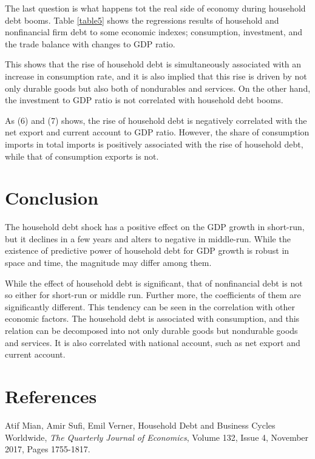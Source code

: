 \documentclass{ltjarticle}
\begin{document}
The last question is what happens tot the real side of economy during household debt booms. Table \ref{table5} shows the regressions results of household and nonfinancial firm debt to some economic indexes; consumption, investment, and the trade balance with changes to GDP ratio. 

This shows that the rise of household debt is simultaneously associated with an increase in consumption rate, and it is also implied that this rise is driven by not only durable goods but also both of nondurables and services. On the other hand, the investment to GDP ratio is not correlated with household debt booms.

As (6) and (7) shows, the rise of household debt is negatively correlated with the net export and current account to GDP ratio. However, the share of consumption imports in total imports is positively associated with the rise of  household debt, while that of consumption exports is not.

\section{Conclusion}
The household debt shock has a positive effect on the GDP growth in short-run, but it declines in a few years and alters to negative in middle-run. While the existence of predictive power of household debt for GDP growth is robust in space and time, the magnitude may differ among them.

While the effect of household debt is significant, that of nonfinancial debt is not so either for short-run or middle run. Further more, the coefficients of them are significantly different. This tendency can be seen in the correlation with other economic factors. The household debt is associated with consumption, and this relation can be decomposed into not only durable goods but nondurable goods and services. It is also correlated with national account, such as net export and current account.

\section*{References}
\noindent{}\zw Atif Mian, Amir Sufi, Emil Verner, Household Debt and Business Cycles Worldwide, \textit{The Quarterly Journal of Economics}, Volume 132, Issue 4, November 2017, Pages 1755-1817.
\end{document}
